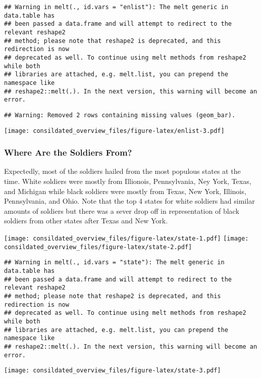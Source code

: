 \documentclass[]{article}
\begin{document}
\begin{verbatim}
## Warning in melt(., id.vars = "enlist"): The melt generic in data.table has
## been passed a data.frame and will attempt to redirect to the relevant reshape2
## method; please note that reshape2 is deprecated, and this redirection is now
## deprecated as well. To continue using melt methods from reshape2 while both
## libraries are attached, e.g. melt.list, you can prepend the namespace like
## reshape2::melt(.). In the next version, this warning will become an error.
\end{verbatim}

\begin{verbatim}
## Warning: Removed 2 rows containing missing values (geom_bar).
\end{verbatim}

\texttt{[image: consildated\_overview\_files/figure-latex/enlist-3.pdf]}

\subsubsection{Where Are the Soldiers
From?}\label{where-are-the-soldiers-from}

Expectedly, most of the soldiers hailed from the most populous states at
the time. White soldiers were mostly from Illionois, Pennsylvania, Ney
York, Texas, and Michigan while black soldiers were mostly from Texas,
New York, Illinois, Pennsylvania, and Ohio. Note that the top 4 states
for white soldiers had similar amounts of soldiers but there was a sever
drop off in representation of black soldiers from other states after
Texas and New York.

\texttt{[image: consildated\_overview\_files/figure-latex/state-1.pdf]}
\texttt{[image: consildated\_overview\_files/figure-latex/state-2.pdf]}

\begin{verbatim}
## Warning in melt(., id.vars = "state"): The melt generic in data.table has
## been passed a data.frame and will attempt to redirect to the relevant reshape2
## method; please note that reshape2 is deprecated, and this redirection is now
## deprecated as well. To continue using melt methods from reshape2 while both
## libraries are attached, e.g. melt.list, you can prepend the namespace like
## reshape2::melt(.). In the next version, this warning will become an error.
\end{verbatim}

\texttt{[image: consildated\_overview\_files/figure-latex/state-3.pdf]}
\end{document}
